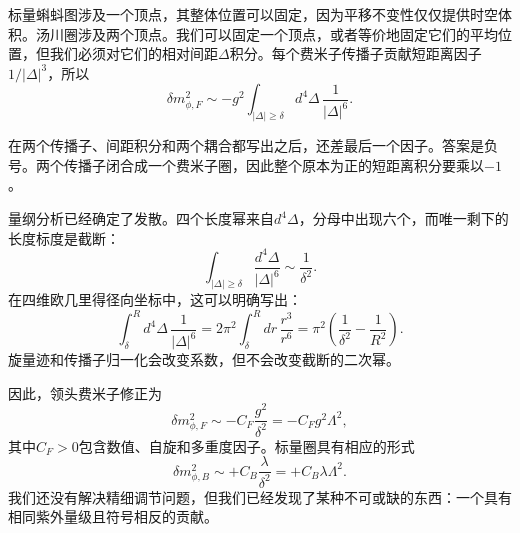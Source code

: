 标量蝌蚪图涉及一个顶点，其整体位置可以固定，因为平移不变性仅仅提供时空体积。汤川圈涉及两个顶点。我们可以固定一个顶点，或者等价地固定它们的平均位置，但我们必须对它们的相对间距\(\Delta\)积分。每个费米子传播子贡献短距离因子\(1/|\Delta|^3\)，所以
\begin{equation}
\delta m_{\phi,F}^2
\sim
-g^2\int_{|\Delta|\geq\delta}d^4\Delta\,
\frac{1}{|\Delta|^6}.
\end{equation}

在两个传播子、间距积分和两个耦合都写出之后，还差最后一个因子。答案是负号。两个传播子闭合成一个费米子圈，因此整个原本为正的短距离积分要乘以\(-1\)。

量纲分析已经确定了发散。四个长度幂来自\(d^4\Delta\)，分母中出现六个，而唯一剩下的长度标度是截断：
\begin{equation}
\int_{|\Delta|\geq\delta}
\frac{d^4\Delta}{|\Delta|^6}
\sim\frac{1}{\delta^2}.
\end{equation}
在四维欧几里得径向坐标中，这可以明确写出：
\begin{equation}
\int_{\delta}^{R}d^4\Delta\,\frac{1}{|\Delta|^6}
=2\pi^2\int_{\delta}^{R}dr\,\frac{r^3}{r^6}
=\pi^2\left(\frac{1}{\delta^2}-\frac{1}{R^2}\right).
\end{equation}
旋量迹和传播子归一化会改变系数，但不会改变截断的二次幂。

\begin{classroomqa}
\end{classroomqa}

\begin{classroomqa}
\end{classroomqa}

因此，领头费米子修正为
\begin{equation}
\delta m_{\phi,F}^2
\sim -C_F\frac{g^2}{\delta^2}
=-C_Fg^2\Lambda^2,
\end{equation}
其中\(C_F>0\)包含数值、自旋和多重度因子。标量圈具有相应的形式
\begin{equation}
\delta m_{\phi,B}^2
\sim+C_B\frac{\lambda}{\delta^2}
=+C_B\lambda\Lambda^2.
\end{equation}
我们还没有解决精细调节问题，但我们已经发现了某种不可或缺的东西：一个具有相同紫外量级且符号相反的贡献。

